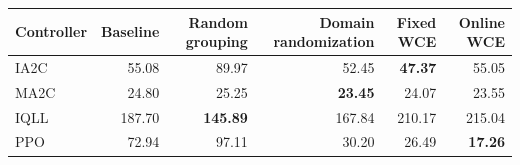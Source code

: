 \begin{tabular}{lrrrrr}
\hline
Controller & Baseline & Random grouping & Domain randomization & Fixed WCE & Online WCE \\
\hline
IA2C & 55.08 & 89.97 & 52.45 & \textbf{47.37} & 55.05 \\
MA2C & 24.80 & 25.25 & \textbf{23.45} & 24.07 & 23.55 \\
IQLL & 187.70 & \textbf{145.89} & 167.84 & 210.17 & 215.04 \\
PPO & 72.94 & 97.11 & 30.20 & 26.49 & \textbf{17.26} \\
\hline
\end{tabular}
